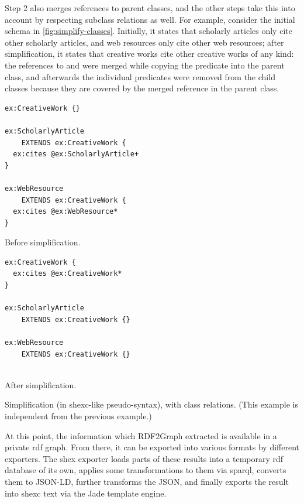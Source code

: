 Step 2 also merges references to parent classes,
and the other steps take this into account by respecting subclass relations as well.
For example, consider the initial \gls{schema} in \cref{fig:simplify-classes}.
Initially, it states that scholarly articles only cite other scholarly articles,
and web resources only cite other web resources;
after simplification, it states that creative works cite other creative works of any kind:
the references to  and 
were merged while copying the  predicate into the  parent class,
and afterwards the individual \glspl{predicate} were removed from the child classes
because they are covered by the merged reference in the parent class.

\begin{lstfloat}[ht]
\begin{sublstfloat}[t]{0.45\textwidth}
\begin{lstlisting}
ex:CreativeWork {}

ex:ScholarlyArticle
    EXTENDS ex:CreativeWork {
  ex:cites @ex:ScholarlyArticle+
}

ex:WebResource
    EXTENDS ex:CreativeWork {
  ex:cites @ex:WebResource*
}
\end{lstlisting}
\caption{Before simplification.}
\label{fig:simplify-classes-before}
\end{sublstfloat}
\begin{sublstfloat}[t]{0.45\textwidth}
\begin{lstlisting}[showlines=true]
ex:CreativeWork {
  ex:cites @ex:CreativeWork*
}

ex:ScholarlyArticle
    EXTENDS ex:CreativeWork {}

ex:WebResource
    EXTENDS ex:CreativeWork {}


\end{lstlisting}
\caption{After simplification.}
\label{fig:simplify-classes-after}
\end{sublstfloat}
\caption[Simplification, with class relations.]{
  Simplification (in \gls{shexc}-like pseudo-syntax), with class relations.
  (This example is independent from the previous example.)
}
\label{fig:simplify-classes}
\end{lstfloat}

At this point, the information which \gls{RDF2Graph} extracted is available in a private \gls{rdf} graph.
From there, it can be exported into various formats by different exporters.
The \gls{shex} exporter loads parts of these results into a temporary \gls{rdf} database of its own,
applies some transformations to them via \gls{sparql},
converts them to JSON-LD,
further transforms the JSON,
and finally exports the result into \gls{shexc} text via the Jade template engine.

